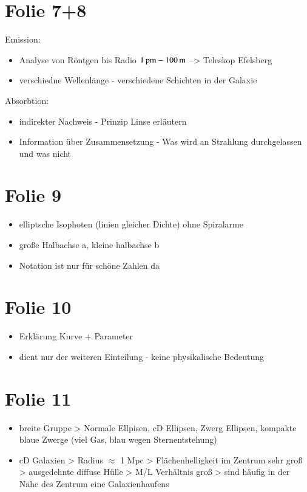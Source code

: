\section{Folie 7+8}


Emission:

\begin{itemize}
\item Analyse von Röntgen bis Radio $\unit[1]{pm} - \unit[100]{m}$ --> Teleskop Efelsberg
\item verschiedne Wellenlänge - verschiedene Schichten in der Galaxie
\end{itemize}

Absorbtion:

\begin{itemize}
\item indirekter Nachweis - Prinzip Linse erläutern
\item Information über Zusammensetzung - Was wird an Strahlung durchgelassen und was nicht
\end{itemize}



\section{Folie 9}

\begin{itemize}
\item elliptsche Isophoten (linien gleicher Dichte) ohne Spiralarme
\item große Halbachse a, kleine halbachse b 
\item Notation ist nur für schöne Zahlen da
\end{itemize}


\section{Folie 10}

\begin{itemize}
\item Erklärung Kurve + Parameter
\item dient nur der weiteren Einteilung - keine physikalische Bedeutung
\end{itemize}


\section{Folie 11}

\begin{itemize}
\item breite Gruppe
\subitem > Normale Ellpisen, cD Ellipsen, Zwerg Ellipsen, kompakte blaue Zwerge (viel Gas, blau wegen Sternentstehung)
\item cD Galaxien
\subitem > Radius $\approx$ 1 Mpc 
\subitem > Flächenhelligkeit im Zentrum sehr groß 
\subitem > ausgedehnte diffuse Hülle
\subitem > M/L Verhältnis groß 
\subitem > sind häufig in der Nähe des Zentrum eine Galaxienhaufens
\end{itemize}



